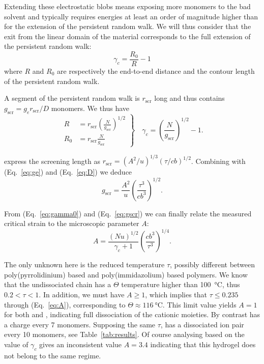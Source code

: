 \documentclass[journal=jacsat,manuscript=article]{achemso}
\begin{document}
Extending these electrostatic blobs means exposing more monomers to the bad solvent and typically requires energies at least an order of magnitude higher than for the extension of the persistent random walk. We will thus consider that the exit from the linear domain of the material corresponds to the full extension of the persistent random walk:
\begin{equation}
\gamma_c = \frac{R_0}{R} - 1
\end{equation}
where $R$ and $R_0$ are respectively the end-to-end distance and the contour length of the persistent random walk.

A segment of the persistent random walk is $r_\mathrm{scr}$ long and thus contains $g_\mathrm{scr} = g_e r_\mathrm{scr}/D$ monomers. We thus have
\begin{equation}
\left. \begin{array}{ll}
R &= r_\mathrm{scr} \left(\frac{N}{g_\mathrm{scr}}\right)^{1/2}\\
R_0 &= r_\mathrm{scr} \frac{N}{g_\mathrm{scr}}
\end{array}\right\rbrace\quad
\gamma_c = \left(\frac{N}{g_\mathrm{scr}}\right)^{1/2} -1\label{eq:gamma0}.
\end{equation}

\citet{Rubinstein1996} express the screening length as
$r_\mathrm{scr} = \left(A^2 / u\right)^{1/3} \left(\tau /cb \right)^{1/2}$. Combining with (Eq.~\ref{eq:ge}) and (Eq.~\ref{eq:D}) we deduce
\begin{equation}
g_\mathrm{scr} = \frac{A^2}{u} \left(\frac{\tau^3}{c b^3}\right)^{1/2}\label{eq:gscr}.
\end{equation}

From (Eq.~\ref{eq:gamma0}) and (Eq.~\ref{eq:gscr}) we can finally relate the measured critical strain to the microscopic parameter $A$:
\begin{equation}
A = \frac{\left(N u\right)^{1/2}}{\gamma_c+1}\left(\frac{c b^3}{\tau^3}\right)^{1/4}.
\label{eq:A}
\end{equation}

The only unknown here is the reduced temperature $\tau$, possibly different between poly\-(pyrrolidinium) based and poly\-(immidazolium) based polymers. We know that the undissociated chain has a $\Theta$ temperature higher than \SI{100}{\celsius}, thus $0.2<\tau<1$. In addition, we must have $A\geq 1$, which implies that $\tau\leq 0.235$ through (Eq.~\ref{eq:A}), corresponding to $\Theta\approx\SI{116}{\celsius}$. This limit value yields $A=1$ for both  and , indicating full dissociation of the cationic moieties. By contrast  has a charge every 7 monomers. Supposing the same $\tau$,  has a dissociated ion pair every 10 monomers, see Table~\ref{tab:results}. Of course analysing  based on the value of $\gamma_c$ gives an inconsistent value $A=3.4$ indicating that this hydrogel does not belong to the same regime.
\end{document}
